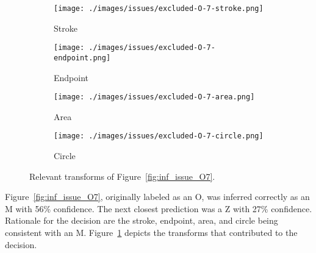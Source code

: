 \begin{figure}[H]
    \centering
    \begin{subfigure}{.20\textwidth}
        \centering
        \texttt{[image: ./images/issues/excluded-O-7-stroke.png]}
        \caption{Stroke}
    \end{subfigure}%
    \begin{subfigure}{.20\textwidth}
        \centering
        \texttt{[image: ./images/issues/excluded-O-7-endpoint.png]}
        \caption{Endpoint}
    \end{subfigure}%
    \begin{subfigure}{.20\textwidth}
        \centering
        \texttt{[image: ./images/issues/excluded-O-7-area.png]}
        \caption{Area}
    \end{subfigure}%
    \begin{subfigure}{.20\textwidth}
        \centering
        \texttt{[image: ./images/issues/excluded-O-7-circle.png]}
        \caption{Circle}
    \end{subfigure}%
    \caption{Relevant transforms of Figure~\ref{fig:inf_issue_O7}.}
    \label{fig:o7_trans}
\end{figure}

Figure~\ref{fig:inf_issue_O7}, originally labeled as an O, was inferred correctly
as an M with 56\% confidence. The next closest prediction was a Z with 27\%
confidence.  Rationale for the decision are the stroke, endpoint, area,
and circle being consistent with an M. Figure~\ref{fig:o7_trans} depicts the
transforms that contributed to the decision.

